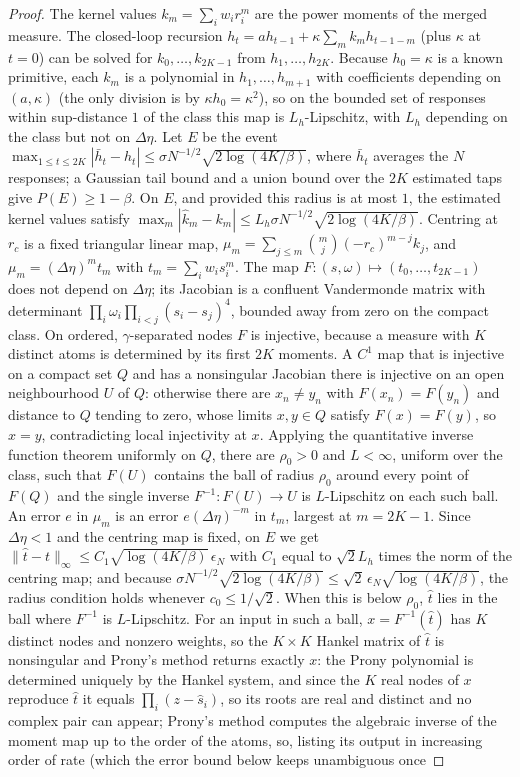 \begin{proof}
The kernel values $k_m=\sum_iw_ir_i^m$ are the power moments of the merged measure. The closed-loop recursion $h_t=ah_{t-1}+\kappa\sum_mk_mh_{t-1-m}$ (plus $\kappa$ at $t=0$) can be solved for $k_0,\ldots,k_{2K-1}$ from $h_1,\ldots,h_{2K}$. Because $h_0=\kappa$ is a known primitive, each $k_m$ is a polynomial in $h_1,\ldots,h_{m+1}$ with coefficients depending on $(a,\kappa)$ (the only division is by $\kappa h_0=\kappa^2$), so on the bounded set of responses within sup-distance $1$ of the class this map is $L_h$-Lipschitz, with $L_h$ depending on the class but not on $\Delta\eta$. Let $E$ be the event $\max_{1\le t\le2K}|\bar h_t-h_t|\le\sigma N^{-1/2}\sqrt{2\log(4K/\beta)}$, where $\bar h_t$ averages the $N$ responses; a Gaussian tail bound and a union bound over the $2K$ estimated taps give $P(E)\ge1-\beta$. On $E$, and provided this radius is at most $1$, the estimated kernel values satisfy $\max_m|\hat k_m-k_m|\le L_h\sigma N^{-1/2}\sqrt{2\log(4K/\beta)}$. Centring at $r_c$ is a fixed triangular linear map, $\mu_m=\sum_{j\le m}\binom mj(-r_c)^{m-j}k_j$, and $\mu_m=(\Delta\eta)^m t_m$ with $t_m=\sum_iw_is_i^m$. The map $F:(s,\omega)\mapsto(t_0,\ldots,t_{2K-1})$ does not depend on $\Delta\eta$; its Jacobian is a confluent Vandermonde matrix with determinant $\prod_i\omega_i\prod_{i<j}(s_i-s_j)^4$, bounded away from zero on the compact class. On ordered, $\gamma$-separated nodes $F$ is injective, because a measure with $K$ distinct atoms is determined by its first $2K$ moments. A $C^1$ map that is injective on a compact set $Q$ and has a nonsingular Jacobian there is injective on an open neighbourhood $U$ of $Q$: otherwise there are $x_n\ne y_n$ with $F(x_n)=F(y_n)$ and distance to $Q$ tending to zero, whose limits $x,y\in Q$ satisfy $F(x)=F(y)$, so $x=y$, contradicting local injectivity at $x$. Applying the quantitative inverse function theorem uniformly on $Q$, there are $\rho_0>0$ and $L<\infty$, uniform over the class, such that $F(U)$ contains the ball of radius $\rho_0$ around every point of $F(Q)$ and the single inverse $F^{-1}:F(U)\to U$ is $L$-Lipschitz on each such ball. An error $e$ in $\mu_m$ is an error $e(\Delta\eta)^{-m}$ in $t_m$, largest at $m=2K-1$. Since $\Delta\eta<1$ and the centring map is fixed, on $E$ we get $\|\hat t-t\|_\infty\le C_1\sqrt{\log(4K/\beta)}\,\epsilon_N$ with $C_1$ equal to $\sqrt2L_h$ times the norm of the centring map; and because $\sigma N^{-1/2}\sqrt{2\log(4K/\beta)}\le\sqrt2\,\epsilon_N\sqrt{\log(4K/\beta)}$, the radius condition holds whenever $c_0\le1/\sqrt2$. When this is below $\rho_0$, $\hat t$ lies in the ball where $F^{-1}$ is $L$-Lipschitz. For an input in such a ball, $x=F^{-1}(\hat t)$ has $K$ distinct nodes and nonzero weights, so the $K\times K$ Hankel matrix of $\hat t$ is nonsingular and Prony's method returns exactly $x$: the Prony polynomial is determined uniquely by the Hankel system, and since the $K$ real nodes of $x$ reproduce $\hat t$ it equals $\prod_i(z-\hat s_i)$, so its roots are real and distinct and no complex pair can appear; Prony's method computes the algebraic inverse of the moment map up to the order of the atoms, so, listing its output in increasing order of rate (which the error bound below keeps unambiguous once 
\end{proof}
